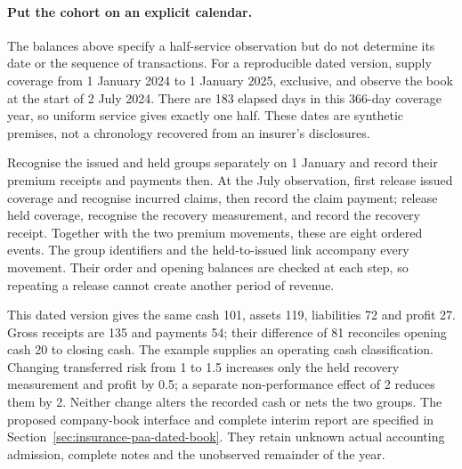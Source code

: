 \paragraph{Put the cohort on an explicit calendar.}
The balances above specify a half-service observation but do not determine its
date or the sequence of transactions. For a reproducible dated version, supply
coverage from 1 January 2024 to 1 January 2025, exclusive, and observe the book
at the start of 2 July 2024. There are 183 elapsed days in this 366-day coverage
year, so uniform service gives exactly one half. These dates are synthetic
premises, not a chronology recovered from an insurer's disclosures.

Recognise the issued and held groups separately on 1 January and record their
premium receipts and payments then. At the July observation, first release
issued coverage and recognise incurred claims, then record the claim payment;
release held coverage, recognise the recovery measurement, and record the
recovery receipt. Together with the two premium movements, these are eight
ordered events. The group identifiers and the held-to-issued link accompany
every movement. Their order and opening balances are checked at each step, so
repeating a release cannot create another period of revenue.

This dated version gives the same cash 101, assets 119, liabilities 72 and
profit 27. Gross receipts are 135 and payments 54; their difference of 81
reconciles opening cash 20 to closing cash. The example supplies an operating
cash classification. Changing transferred risk from 1 to 1.5 increases only
the held recovery measurement and profit by 0.5; a separate non-performance
effect of 2 reduces them by 2. Neither change alters the recorded cash or nets
the two groups. The proposed company-book interface and complete interim report
are specified in Section~\ref{sec:insurance-paa-dated-book}. They retain unknown
actual accounting admission, complete notes and the unobserved remainder of
the year.

